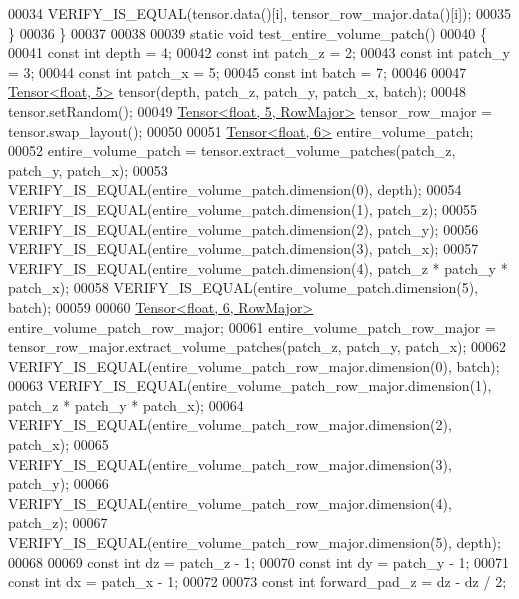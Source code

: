 \begin{DoxyCode}
00034     VERIFY\_IS\_EQUAL(tensor.data()[i], tensor\_row\_major.data()[i]);
00035   \}
00036 \}
00037 
00038 
00039 \textcolor{keyword}{static} \textcolor{keywordtype}{void} test\_entire\_volume\_patch()
00040 \{
00041   \textcolor{keyword}{const} \textcolor{keywordtype}{int} depth = 4;
00042   \textcolor{keyword}{const} \textcolor{keywordtype}{int} patch\_z = 2;
00043   \textcolor{keyword}{const} \textcolor{keywordtype}{int} patch\_y = 3;
00044   \textcolor{keyword}{const} \textcolor{keywordtype}{int} patch\_x = 5;
00045   \textcolor{keyword}{const} \textcolor{keywordtype}{int} batch = 7;
00046 
00047   \hyperlink{class_eigen_1_1_tensor}{Tensor<float, 5>} tensor(depth, patch\_z, patch\_y, patch\_x, batch);
00048   tensor.setRandom();
00049   \hyperlink{class_eigen_1_1_tensor}{Tensor<float, 5, RowMajor>} tensor\_row\_major = tensor.swap\_layout();
00050 
00051   \hyperlink{class_eigen_1_1_tensor}{Tensor<float, 6>} entire\_volume\_patch;
00052   entire\_volume\_patch = tensor.extract\_volume\_patches(patch\_z, patch\_y, patch\_x);
00053   VERIFY\_IS\_EQUAL(entire\_volume\_patch.dimension(0), depth);
00054   VERIFY\_IS\_EQUAL(entire\_volume\_patch.dimension(1), patch\_z);
00055   VERIFY\_IS\_EQUAL(entire\_volume\_patch.dimension(2), patch\_y);
00056   VERIFY\_IS\_EQUAL(entire\_volume\_patch.dimension(3), patch\_x);
00057   VERIFY\_IS\_EQUAL(entire\_volume\_patch.dimension(4), patch\_z * patch\_y * patch\_x);
00058   VERIFY\_IS\_EQUAL(entire\_volume\_patch.dimension(5), batch);
00059 
00060   \hyperlink{class_eigen_1_1_tensor}{Tensor<float, 6, RowMajor>} entire\_volume\_patch\_row\_major;
00061   entire\_volume\_patch\_row\_major = tensor\_row\_major.extract\_volume\_patches(patch\_z, patch\_y, patch\_x);
00062   VERIFY\_IS\_EQUAL(entire\_volume\_patch\_row\_major.dimension(0), batch);
00063   VERIFY\_IS\_EQUAL(entire\_volume\_patch\_row\_major.dimension(1), patch\_z * patch\_y * patch\_x);
00064   VERIFY\_IS\_EQUAL(entire\_volume\_patch\_row\_major.dimension(2), patch\_x);
00065   VERIFY\_IS\_EQUAL(entire\_volume\_patch\_row\_major.dimension(3), patch\_y);
00066   VERIFY\_IS\_EQUAL(entire\_volume\_patch\_row\_major.dimension(4), patch\_z);
00067   VERIFY\_IS\_EQUAL(entire\_volume\_patch\_row\_major.dimension(5), depth);
00068 
00069   \textcolor{keyword}{const} \textcolor{keywordtype}{int} dz = patch\_z - 1;
00070   \textcolor{keyword}{const} \textcolor{keywordtype}{int} dy = patch\_y - 1;
00071   \textcolor{keyword}{const} \textcolor{keywordtype}{int} dx = patch\_x - 1;
00072 
00073   \textcolor{keyword}{const} \textcolor{keywordtype}{int} forward\_pad\_z = dz - dz / 2;

\end{DoxyCode}
